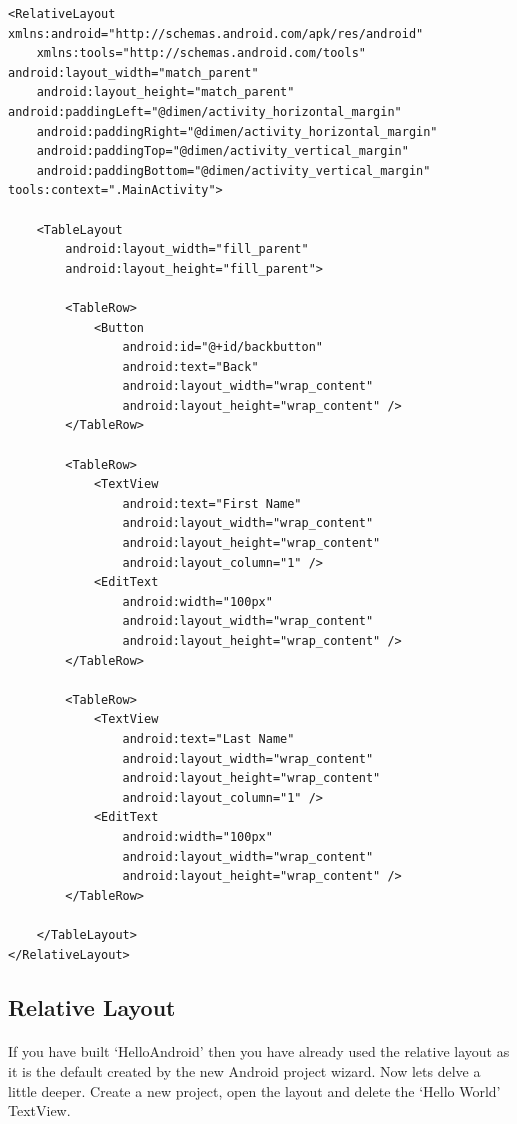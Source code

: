 \documentclass[12pt, a4paper, twoside]{book}
\begin{document}
\begin{lstlisting}
<RelativeLayout xmlns:android="http://schemas.android.com/apk/res/android"
    xmlns:tools="http://schemas.android.com/tools" android:layout_width="match_parent"
    android:layout_height="match_parent" android:paddingLeft="@dimen/activity_horizontal_margin"
    android:paddingRight="@dimen/activity_horizontal_margin"
    android:paddingTop="@dimen/activity_vertical_margin"
    android:paddingBottom="@dimen/activity_vertical_margin" tools:context=".MainActivity">

    <TableLayout
        android:layout_width="fill_parent"
        android:layout_height="fill_parent">

        <TableRow>
            <Button
                android:id="@+id/backbutton"
                android:text="Back"
                android:layout_width="wrap_content"
                android:layout_height="wrap_content" />
        </TableRow>

        <TableRow>
            <TextView
                android:text="First Name"
                android:layout_width="wrap_content"
                android:layout_height="wrap_content"
                android:layout_column="1" />
            <EditText
                android:width="100px"
                android:layout_width="wrap_content"
                android:layout_height="wrap_content" />
        </TableRow>

        <TableRow>
            <TextView
                android:text="Last Name"
                android:layout_width="wrap_content"
                android:layout_height="wrap_content"
                android:layout_column="1" />
            <EditText
                android:width="100px"
                android:layout_width="wrap_content"
                android:layout_height="wrap_content" />
        </TableRow>

    </TableLayout>
</RelativeLayout>
\end{lstlisting}



\subsection{Relative Layout} 
\paragraph{} If you have built `HelloAndroid' then you have already used the relative layout as it is the default created by the new Android project wizard. Now lets delve a little deeper. Create a new project, open the layout and delete the `Hello World' TextView.
\end{document}
